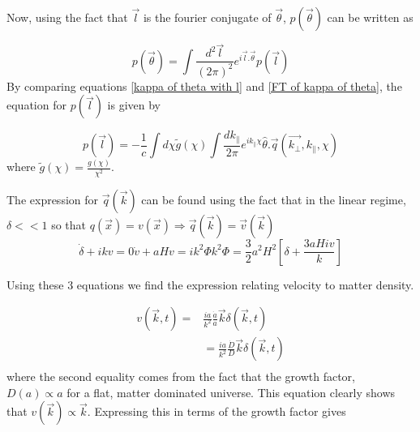 \documentclass[12pt]{article}
\begin{document}
\noindent Now, using the fact that $\vec{l}$ is the fourier conjugate of $\vec{\theta}$, $p(\vec{\theta})$ can be written as 

\begin{equation}\label{FT of kappa of theta}
p(\vec{\theta})=\int \frac{d^2 \vec{l}}{(2\pi)^2} e^{i\vec{l}.\vec{\theta}}p(\vec{l})
\end{equation}   
By comparing equations \ref{kappa of theta with l} and \ref{FT of kappa of theta}, the equation for $p(\vec{l})$ is given by

\begin{equation}\label{final p(l) equation}
p(\vec{l})=-\frac{1}{c}\int d\chi  \widetilde{g}(\chi ) \int \frac{dk_\parallel}{2\pi} e^{ik_{\parallel}\chi } \hat{\theta}.\vec{q}(\vec{k_\bot},k_\parallel,\chi )
\end{equation}
where $\widetilde{g}(\chi)=\frac{g(\chi )}{\chi ^2}$.


The expression for $\vec{q}(\vec{k})$ can be found using the fact that in the linear regime, $\delta <<  1$ so that $q(\vec{x})=v(\vec{x})\Rightarrow \vec{q}(\vec{k})=\vec{v}(\vec{k})$
\begin{subequations}
	\begin{equation}
	\dot{\delta}+ikv=0
	\end{equation}
	\begin{equation}
	\dot{v} +aHv=ik^2\Phi
	\end{equation}
	\begin{equation}
	k^2\Phi=\frac{3}{2}a^2H^2\left[\delta+\frac{3aHiv}{k}\right]
	\end{equation}
\end{subequations} 

Using these 3 equations we find the expression relating velocity to matter density.

\begin{equation}\label{v(k)}
\begin{aligned}
v(\vec{k},t)=&\frac{ia}{k^2}\frac{\dot{a}}{a}\vec{k}\delta(\vec{k},t)\\
&=\frac{ia}{k^2}\frac{\dot{D}}{D}\vec{k}\delta(\vec{k},t)\\
\end{aligned}
\end{equation}
where the second equality comes from the fact that the growth factor, $D(a) \propto a$ for a flat, matter dominated universe.
This equation clearly shows that $v(\vec{k}) \propto \vec{k}$. Expressing this in terms of the growth factor gives
\end{document}
